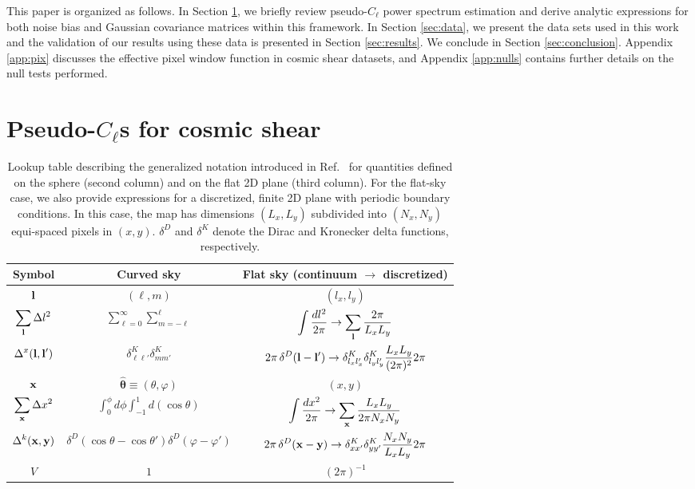 \documentclass[a4paper,11pt]{article}
\newcommand{\nv}{\hat{\boldsymbol{\theta}}}
\newcommand{\summ}[1]{\sum_{\bf #1}\Delta #1^2}
\begin{document}
    This paper is organized as follows. In Section \ref{sec:pcl}, we briefly review pseudo-$C_\ell$ power spectrum estimation and derive  analytic expressions for both noise bias and Gaussian covariance matrices within this framework. In Section \ref{sec:data}, we present the data sets used in this work and the validation of our results using these data is presented in Section \ref{sec:results}. We conclude in Section \ref{sec:conclusion}. Appendix \ref{app:pix} discusses the effective pixel window function in cosmic shear datasets, and Appendix \ref{app:nulls} contains further details on the null tests performed.
    
  \section{Pseudo-$C_\ell$s for cosmic shear}\label{sec:pcl}
    \begin{table}
      \centering
      \begin{tabular}{|c|c|c|}
        \hline
        Symbol & Curved sky & Flat sky (continuum $\rightarrow$ discretized) \\
        \hline
        \(\displaystyle {\bf l} \) & \(\displaystyle (\ell,m) \) & \(\displaystyle (l_x,l_y) \) \\
        \(\displaystyle \summ{l} \) & \(\displaystyle \sum_{\ell=0}^{\infty} \sum_{m=-\ell}^{\ell} \) & \(\displaystyle \int \frac{dl^2}{2\pi} \rightarrow \sum_{\bf l}\frac{2\pi}{L_xL_y}\) \\
        \(\displaystyle \Delta^x({\bf l},{\bf l}')\) & \(\displaystyle \delta^K_{\ell\ell'}\delta^K_{mm'}\) & \(\displaystyle 2\pi\,\delta^D({\bf l}-{\bf l}')\rightarrow \delta^K_{l_xl'_x}\delta^K_{l_yl'_y}\frac{L_xL_y}{(2\pi)^2}2\pi\) \\
        \(\displaystyle {\bf x}\) & \(\displaystyle \nv\equiv(\theta,\varphi) \) & \(\displaystyle (x,y)\) \\
        \(\displaystyle \summ{x} \) & \(\displaystyle \int_0^{\phi} d\phi \int_{-1}^{1} d(\cos\theta)\) & \(\displaystyle \int \frac{dx^2}{2\pi}\rightarrow\sum_{\bf x}\frac{L_xL_y}{2\pi N_xN_y}\) \\
        \(\displaystyle \Delta^k({\bf x},{\bf y})\) & \(\displaystyle \delta^D(\cos\theta-\cos\theta')\delta^D(\varphi-\varphi')\) & \(\displaystyle 2\pi\,\delta^D({\bf x}-{\bf y})\rightarrow\delta^K_{xx'}\delta^K_{yy'}\frac{N_xN_y}{L_xL_y}2\pi\) \\
        \(\displaystyle V \) & \(\displaystyle 1 \) & \(\displaystyle (2\pi)^{-1}\) \\
        \hline
      \end{tabular}
      \caption{Lookup table describing the generalized notation introduced in Ref.~\cite{1906.11765} for quantities defined on the sphere (second column) and on the flat 2D plane (third column). For the flat-sky case, we also provide expressions for a discretized, finite 2D plane with periodic boundary conditions. In this case, the map has dimensions $(L_x,L_y)$ subdivided into $(N_x,N_y)$ equi-spaced pixels in $(x,y)$. $\delta^D$ and $\delta^K$ denote the Dirac and Kronecker delta functions, respectively.}\label{tab:notation}
    \end{table}
\end{document}
